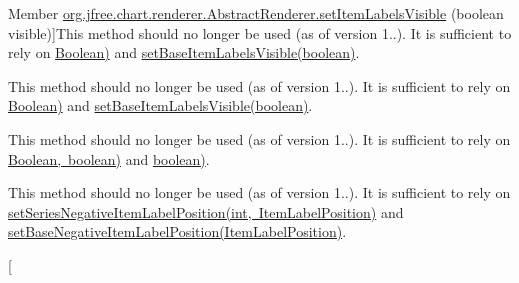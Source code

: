 \begin{DoxyRefList}
Member \mbox{\hyperlink{classorg_1_1jfree_1_1chart_1_1renderer_1_1_abstract_renderer_abc3441569a05e9f2d2cbdd6744e820a9}{org.jfree.chart.renderer.Abstract\+Renderer.set\+Item\+Labels\+Visible}} (boolean visible)]This method should no longer be used (as of version 1..). It is sufficient to rely on \mbox{\hyperlink{}{Boolean)}} and \mbox{\hyperlink{classorg_1_1jfree_1_1chart_1_1renderer_1_1_abstract_renderer_aef1e2688293f0bdb55b4c4cdaf0fde9c}{set\+Base\+Item\+Labels\+Visible(boolean)}}.  
\item[\label{deprecated__deprecated000129}%
\Hypertarget{deprecated__deprecated000129}%
Member \mbox{\hyperlink{classorg_1_1jfree_1_1chart_1_1renderer_1_1_abstract_renderer_a7c4b0f5905455a8e7271bf87a6ccbb7f}{org.jfree.chart.renderer.Abstract\+Renderer.set\+Item\+Labels\+Visible}} (Boolean visible)]This method should no longer be used (as of version 1..). It is sufficient to rely on \mbox{\hyperlink{}{Boolean)}} and \mbox{\hyperlink{classorg_1_1jfree_1_1chart_1_1renderer_1_1_abstract_renderer_aef1e2688293f0bdb55b4c4cdaf0fde9c}{set\+Base\+Item\+Labels\+Visible(boolean)}}.  
\item[\label{deprecated__deprecated000130}%
\Hypertarget{deprecated__deprecated000130}%
Member \mbox{\hyperlink{classorg_1_1jfree_1_1chart_1_1renderer_1_1_abstract_renderer_a6946afbd4d7476711bd5c502a99cc9cc}{org.jfree.chart.renderer.Abstract\+Renderer.set\+Item\+Labels\+Visible}} (Boolean visible, boolean notify)]This method should no longer be used (as of version 1..). It is sufficient to rely on \mbox{\hyperlink{}{Boolean, boolean)}} and \mbox{\hyperlink{classorg_1_1jfree_1_1chart_1_1renderer_1_1_abstract_renderer_ab9850c8c551535e4f5557853d505ac15}{boolean)}}.  
\item[\label{deprecated__deprecated000141}%
\Hypertarget{deprecated__deprecated000141}%
Member \mbox{\hyperlink{classorg_1_1jfree_1_1chart_1_1renderer_1_1_abstract_renderer_a24fd71d04b101f4636e57eb2d5e60b61}{org.jfree.chart.renderer.Abstract\+Renderer.set\+Negative\+Item\+Label\+Position}} (Item\+Label\+Position position)]This method should no longer be used (as of version 1..). It is sufficient to rely on \mbox{\hyperlink{classorg_1_1jfree_1_1chart_1_1renderer_1_1_abstract_renderer_a308ce803c5fb75f2804b6f54d24877f5}{set\+Series\+Negative\+Item\+Label\+Position(int, Item\+Label\+Position)}} and \mbox{\hyperlink{classorg_1_1jfree_1_1chart_1_1renderer_1_1_abstract_renderer_a7b884e49e671f85f564084b3be63aa3d}{set\+Base\+Negative\+Item\+Label\+Position(\+Item\+Label\+Position)}}.  
\item[\label{deprecated__deprecated000142}%

\end{DoxyRefList}
